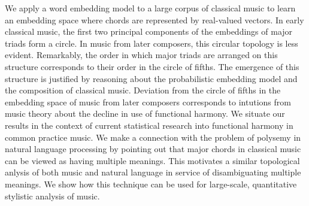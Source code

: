 
We apply a word embedding model to a large corpus of classical music to learn an embedding space where chords are represented by real-valued vectors.
In early classical music, the first two principal components of the embeddings of major triads form a circle. In music from later composers, this circular topology is less evident. 
Remarkably, the order in which major triads are arranged on this structure corresponds to their order in the circle of fifths.
The emergence of this structure is justified by reasoning about the probabilistic embedding model and the composition of classical music.
Deviation from the circle of fifths in the embedding space of music from later composers corresponds to intutions from music theory about the decline in use of functional harmony.
We situate our results in the context of current statistical research into functional harmony in common practice music. We make a connection with the problem of polysemy in natural language processing by pointing out that major chords in classical music can be viewed as having multiple meanings. This motivates a similar topological anlysis of both music and natural language in service of disambiguating multiple meanings.
We show how this technique can be used for large-scale, quantitative stylistic analysis of music.
